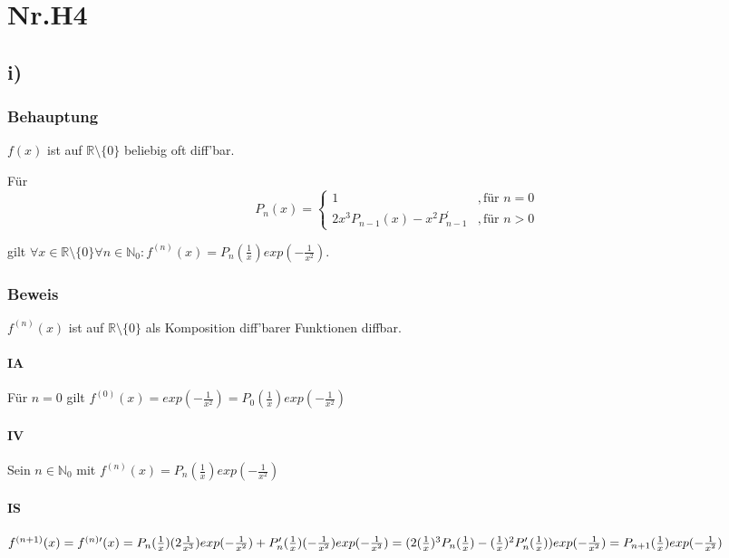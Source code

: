 \section*{Nr.H4}

\subsection*{i)}

\subsubsection*{Behauptung}

$f(x)$ ist auf $\mathbb{R} \setminus \{0\}$ beliebig oft diff'bar.
	
Für
	\[ P_{n}(x) = 
		\begin{cases} 
			1                                         &, \text{für } n = 0 \\
			2x^{3}P_{n-1}(x)-x^{2}P^{\prime}_{n-1}   &, \text{für } n > 0 
		\end{cases} 
	\]
	
gilt $\forall x \in \mathbb{R} \setminus \{0\} \forall n \in \mathbb{N}_{0} : 
	f^{(n)}(x)= P_{n}(\frac{1}{x})exp(- \frac{1}{x^{2}})$.

\subsubsection*{Beweis}

$f^{(n)}(x)$ ist auf $\mathbb{R} \setminus \{0\}$ als Komposition diff'barer Funktionen diffbar.

\paragraph*{IA}
	
Für $n = 0$ gilt $f^{(0)}(x) = exp(- \frac{1}{x^{2}}) = P_{0}(\frac{1}{x})exp(- \frac{1}{x^{2}})$

\paragraph*{IV}

Sein $n \in \mathbb{N}_{0}$ mit $f^{(n)}(x)= P_{n}(\frac{1}{x})exp(- \frac{1}{x^{2}})$

\paragraph*{IS}

$f^{(n+1)}(x) = f^{(n)\prime}(x)\\
	= P_{n}(\frac{1}{x})(2\frac{1}{x^{3}})exp(- \frac{1}{x^{2}}) 
		+ P^{\prime}_{n}(\frac{1}{x})(-\frac{1}{x^{2}})exp(- \frac{1}{x^{2}}) \\
	= (2(\frac{1}{x})^{3}P_{n}(\frac{1}{x})
		 -(\frac{1}{x})^{2}P^{\prime}_{n}(\frac{1}{x}))exp(- \frac{1}{x^{2}}) \\
	= P_{n+1}(\frac{1}{x})exp(- \frac{1}{x^{2}})$ 




	